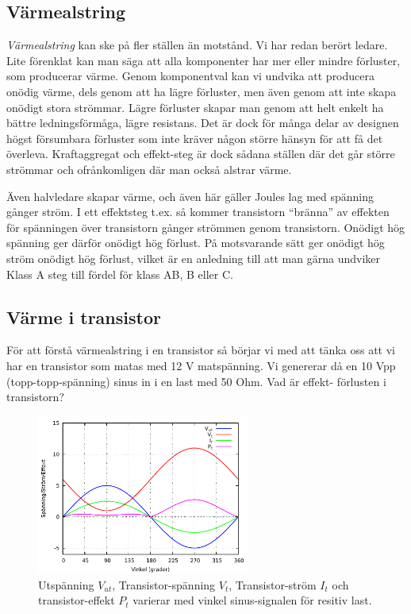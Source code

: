 \subsection{Värmealstring}

\emph{Värmealstring} kan ske på fler ställen än motstånd. Vi har redan berört
ledare. Lite förenklat kan man säga att alla komponenter har mer eller mindre
förluster, som producerar värme. Genom komponentval kan vi undvika att
producera onödig värme, dels genom att ha lägre förluster, men även genom att
inte skapa onödigt stora strömmar. Lägre förluster skapar man genom att helt
enkelt ha bättre ledningsförmåga, lägre resistans. Det är dock för många
delar av designen högst försumbara förluster som inte kräver någon större
hänsyn för att få det överleva. Kraftaggregat och effekt-steg är dock sådana
ställen där det går större strömmar och ofrånkomligen där man också alstrar
värme.

Även halvledare skapar värme, och även här gäller Joules lag med spänning
gånger ström. I ett effektsteg t.ex. så kommer transistorn ``bränna'' av
effekten för spänningen över transistorn gånger strömmen genom transistorn.
Onödigt hög spänning ger därför onödigt hög förlust. På motsvarande sätt ger
onödigt hög ström onödigt hög förlust, vilket är en anledning till att man
gärna undviker Klass A steg till fördel för klass AB, B eller C.

\subsection{Värme i transistor}

För att förstå värmealstring i en transistor så börjar vi med att tänka oss
att vi har en transistor som matas med 12 V matspänning. Vi genererar då en
10 Vpp (topp-topp-spänning) sinus in i en last med 50 Ohm. Vad är effekt-
förlusten i transistorn?

\begin{figure}[h]
\begin{center}
\includegraphics[width=7cm]{images/power1}
\caption{Utspänning $V_{ut}$, Transistor-spänning $V_t$, Transistor-ström $I_t$ och transistor-effekt $P_t$ varierar med vinkel sinus-signalen för resitiv last.}
\label{fig:power1}
\end{center}
\end{figure}

